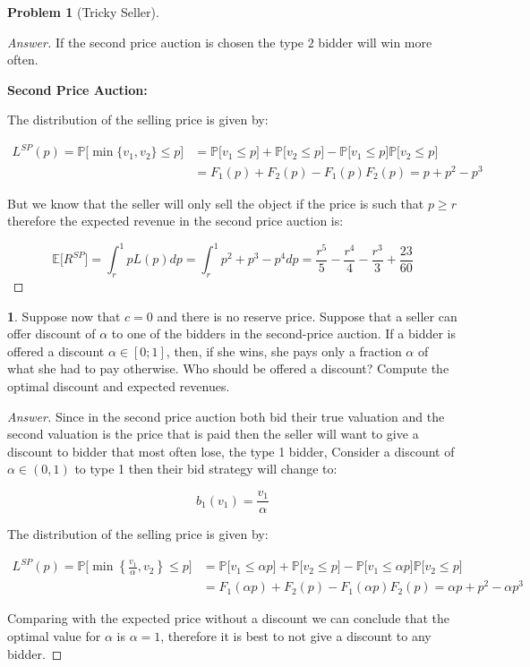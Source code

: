 \documentclass[12pt]{article}
\theoremstyle{definition}
\newtheorem{problem}{Problem}
\newtheorem{subproblem}{}[problem]
\begin{document}
\begin{problem}[Tricky Seller]
\begin{proof}[Answer]
If the second price auction is chosen the type $2$ bidder will win more often.

\textbf{Second Price Auction:} 

The distribution of the selling price is given by:

\begin{align*}
L^{SP}(p) = \mathbb{P}\Big[\min\{v_1,v_2\}\leq p\Big] &=  \mathbb{P}\Big[v_1 \leq p\Big] +  \mathbb{P}\Big[v_2\leq p\Big] -   \mathbb{P}\Big[v_1 \leq p\Big] \mathbb{P}\Big[v_2\leq p\Big]\\&= F_1(p)+F_2(p)-F_1(p)F_2(p) = p+p^2-p^3
\end{align*}

But we know that the seller will only sell the object if the price is such that $p\geq r$ therefore the expected revenue in the second price auction is:

$$\mathbb{E}\Big[R^{SP}\Big] = \int_{r}^1pL(p)dp = \int_{r}^1 p^2+p^3-p^4 dp  = \frac{r^5}{5}-\frac{r^4}{4}-\frac{r^3}{3}+\frac{23}{60}$$

\end{proof}
\begin{subproblem}
Suppose now that $c=0$ and there is no reserve price. Suppose that a seller can offer discount of $\alpha$ to one of the bidders in the second-price auction. If a bidder is offered a discount $\alpha \in[0 ; 1]$, then, if she wins, she pays only a fraction $\alpha$ of what she had to pay otherwise. Who should be offered a discount? Compute the optimal discount and expected revenues.
\end{subproblem}
\begin{proof}[Answer]

Since in the second price auction both bid their true valuation and the second valuation is the price that is paid then the seller will want to give a discount to bidder that most often lose, the type 1 bidder, Consider a discount of $\alpha\in(0,1)$ to type 1 then their bid strategy will change to:

$$b_1(v_1) = \frac{v_1}{\alpha}$$

The distribution of the selling price is given by:

\begin{align*}
L^{SP}(p) = \mathbb{P}\Big[\min\left\{\frac{v_1}{\alpha},v_2 \right\}\leq p\Big] &=  \mathbb{P}\Big[v_1 \leq \alpha p\Big] +  \mathbb{P}\Big[v_2\leq p\Big] -   \mathbb{P}\Big[v_1 \leq \alpha p\Big] \mathbb{P}\Big[v_2\leq p\Big]\\&= F_1(\alpha p)+F_2(p)-F_1(\alpha p)F_2(p) = \alpha p+p^2-\alpha p^3
\end{align*}

Comparing with the expected price without a discount we can conclude that the optimal value for $\alpha$ is $\alpha=1$, therefore it is best to not give a discount to any bidder.

\end{proof}

\end{problem}
\end{document}
